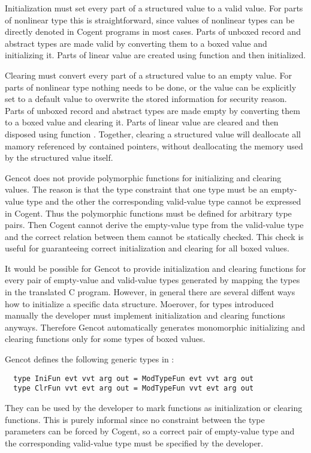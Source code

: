Initialization must set every part of a structured value to a valid value. For parts of nonlinear type this is
straightforward, since values of nonlinear types can be directly denoted in Cogent programs in most cases. Parts
of unboxed record and abstract types are made valid by converting them to a boxed value and initializing it.
Parts of linear value are created using function  and then initialized.

Clearing must convert every part of a structured value to an empty value. For parts of nonlinear type nothing
needs to be done, or the value can be explicitly set to a default value to overwrite the stored information for
security reason. Parts of unboxed record and abstract types are made empty by converting them to a boxed value 
and clearing it. Parts of linear value are cleared and then disposed using function . Together, 
clearing a structured value will deallocate all mamory referenced by contained pointers, without deallocating
the memory used by the structured value itself.

Gencot does not provide polymorphic functions for initializing and clearing values. The reason is that the type
constraint that one type must be an empty-value type and the other the corresponding valid-value type cannot be
expressed in Cogent. Thus the polymorphic functions must be defined for arbitrary type pairs. Then Cogent cannot 
derive the empty-value type from the valid-value type and the correct relation between them cannot be statically
checked. This check is useful for guaranteeing correct initialization and clearing for all boxed values.

It would be possible for Gencot to provide initialization and clearing functions for every pair of empty-value
and valid-value types generated by mapping the types in the translated C program. However, in general there are 
several diffent ways how to initialize a specific data structure. Moerover, for types introduced manually the developer 
must implement initialization and clearing functions anyways. Therefore Gencot automatically generates
monomorphic initializing and clearing functions only for some types of boxed values.

Gencot defines the following generic types in :
\begin{verbatim}
  type IniFun evt vvt arg out = ModTypeFun evt vvt arg out
  type ClrFun vvt evt arg out = ModTypeFun vvt evt arg out
\end{verbatim}
They can be used by the developer to mark functions as initialization or clearing functions. This is purely 
informal since no constraint between the type parameters can be forced by Cogent, so a correct pair of 
empty-value type and the corresponding valid-value type must be specified by the developer.

